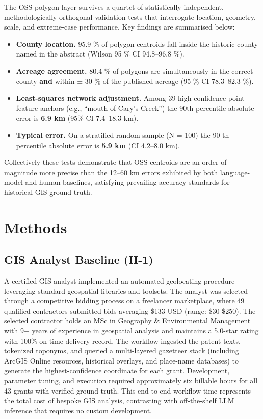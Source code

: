 The OSS polygon layer survives a quartet of statistically independent,
methodologically orthogonal validation tests that interrogate location,
geometry, scale, and extreme-case performance. Key findings are
summarised below:

\begin{itemize}
\tightlist
\item
  \textbf{County location.} 95.9 \% of polygon centroids fall inside the
  historic county named in the abstract (Wilson 95 \% CI 94.8--96.8 \%).
\item
  \textbf{Acreage agreement.} 80.4 \% of polygons are simultaneously in
  the correct county \textbf{and} within ± 30 \% of the published
  acreage (95 \% CI 78.3--82.3 \%).
\item
  \textbf{Least-squares network adjustment.} Among 39 high-confidence
  point-feature anchors (e.g., ``mouth of Cary's Creek'') the 90th
  percentile absolute error is \textbf{6.9 km} (95\% CI 7.4--18.3 km).
\item
  \textbf{Typical error.} On a stratified random sample (N = 100) the
  90-th percentile absolute error is \textbf{5.9 km} (CI 4.2--8.0 km).
\end{itemize}

Collectively these tests demonstrate that OSS centroids are an order of
magnitude more precise than the 12--60 km errors exhibited by both
language-model and human baselines, satisfying prevailing accuracy
standards for historical-GIS ground truth.

\section{Methods}\label{methods}

\subsection{GIS Analyst Baseline
(H-1)}\label{gis-analyst-baseline-h-1}

A certified GIS analyst \citep{Bashorun2025_gis} implemented an
automated geolocating procedure leveraging standard geospatial libraries
and toolsets. The analyst was selected through a competitive bidding
process on a freelancer marketplace, where 49 qualified contractors
submitted bids averaging \$133 USD (range: \$30-\$250). The selected
contractor holds an MSc in Geography \& Environmental Management with 9+
years of experience in geospatial analysis and maintains a 5.0-star
rating with 100\% on-time delivery record. The workflow ingested the
patent texts, tokenized toponyms, and queried a multi-layered gazetteer
stack (including ArcGIS Online resources, historical overlays, and
place-name databases) to generate the highest-confidence coordinate for
each grant. Development, parameter tuning, and execution required
approximately six billable hours for all 43 grants with verified ground
truth. This end-to-end workflow time represents the total cost of
bespoke GIS analysis, contrasting with off-the-shelf LLM inference that
requires no custom development.

